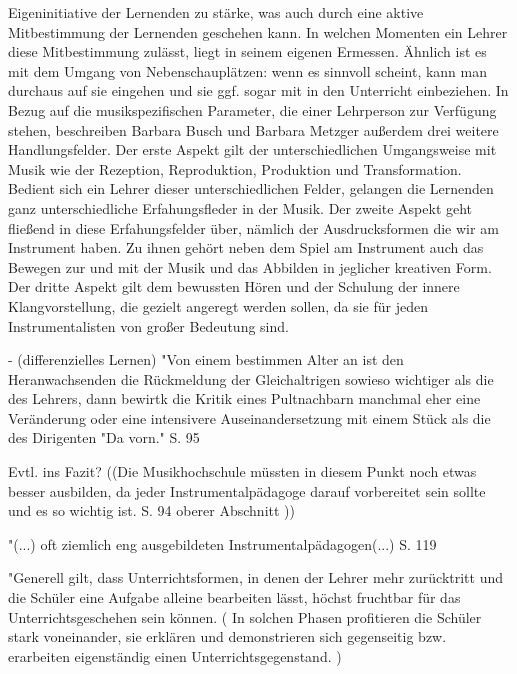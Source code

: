 Eigeninitiative der Lernenden zu stärke, was auch durch eine aktive
Mitbestimmung der Lernenden geschehen kann. In welchen Momenten ein Lehrer diese
Mitbestimmung zulässt, liegt in seinem eigenen Ermessen. Ähnlich ist es mit dem
Umgang von Nebenschauplätzen: wenn es sinnvoll scheint, kann man durchaus auf
sie eingehen und sie ggf. sogar mit in den Unterricht einbeziehen. In Bezug auf
die musikspezifischen Parameter, die einer Lehrperson zur Verfügung stehen,
beschreiben Barbara Busch und Barbara Metzger außerdem drei weitere
Handlungsfelder. Der erste Aspekt gilt der unterschiedlichen Umgangsweise mit
Musik wie der Rezeption, Reproduktion, Produktion und Transformation. Bedient
sich ein Lehrer dieser unterschiedlichen Felder, gelangen die Lernenden ganz
unterschiedliche Erfahungsfleder in der Musik. Der zweite Aspekt geht fließend
in diese Erfahungsfelder über, nämlich der Ausdrucksformen die wir am Instrument
haben. Zu ihnen gehört neben dem Spiel am Instrument auch das Bewegen zur und
mit der Musik und das Abbilden in jeglicher kreativen Form. Der dritte Aspekt
gilt dem bewussten Hören und der Schulung der innere Klangvorstellung, die
gezielt angeregt werden sollen, da sie für jeden Instrumentalisten von großer
Bedeutung sind.

- (differenzielles Lernen) "Von einem bestimmen Alter an ist den Heranwachsenden
die Rückmeldung der Gleichaltrigen sowieso wichtiger als die des Lehrers, dann
bewirtk die Kritik eines Pultnachbarn manchmal eher eine Veränderung oder eine
intensivere Auseinandersetzung mit einem Stück als die des Dirigenten "Da vorn."
S. 95


Evtl. ins Fazit? ((Die Musikhochschule müssten in diesem Punkt noch etwas besser
ausbilden, da jeder Instrumentalpädagoge darauf vorbereitet sein sollte und es
so wichtig ist. S. 94 oberer Abschnitt ))

"(...) oft ziemlich eng ausgebildeten Instrumentalpädagogen(...) S. 119


"Generell gilt, dass Unterrichtsformen, in denen der Lehrer mehr zurücktritt und
die Schüler eine Aufgabe alleine bearbeiten lässt, höchst fruchtbar für das
Unterrichtsgeschehen sein können. ( In solchen Phasen profitieren die Schüler
stark voneinander, sie erklären und demonstrieren sich gegenseitig bzw.
erarbeiten eigenständig einen Unterrichtsgegenstand. ) 
